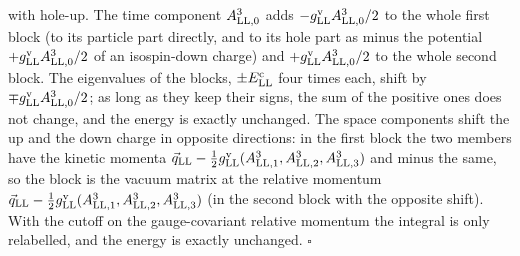 \documentclass[
  10pt,
]{article}
\begin{document}
\begin{enumerate}
  with hole-up. The time component \(A^3_{{\rm LL},0}\) adds
  \(-g^{\rm v}_{\rm LL}A^3_{{\rm LL},0}/2\) to the whole first block (to
  its particle part directly, and to its hole part as minus the
  potential \(+g^{\rm v}_{\rm LL}A^3_{{\rm LL},0}/2\) of an isospin-down
  charge) and \(+g^{\rm v}_{\rm LL}A^3_{{\rm LL},0}/2\) to the whole
  second block. The eigenvalues of the blocks,
  \(\pm E^{\rm c}_{\rm LL}\) four times each, shift by
  \(\mp g^{\rm v}_{\rm LL}A^3_{{\rm LL},0}/2\); as long as they keep
  their signs, the sum of the positive ones does not change, and the
  energy is exactly unchanged. The space components shift the up and the
  down charge in opposite directions: in the first block the two members
  have the kinetic momenta
  \(\vec q_{\rm LL}-\tfrac12g^{\rm v}_{\rm LL}(A^3_{{\rm LL},1},A^3_{{\rm LL},2},A^3_{{\rm LL},3})\)
  and minus the same, so the block is the vacuum matrix at the relative
  momentum
  \(\vec q_{\rm LL}-\tfrac12g^{\rm v}_{\rm LL}(A^3_{{\rm LL},1},A^3_{{\rm LL},2},A^3_{{\rm LL},3})\)
  (in the second block with the opposite shift). With the cutoff on the
  gauge-covariant relative momentum the integral is only relabelled, and
  the energy is exactly unchanged. \(\square\)
\end{enumerate}
\end{document}
